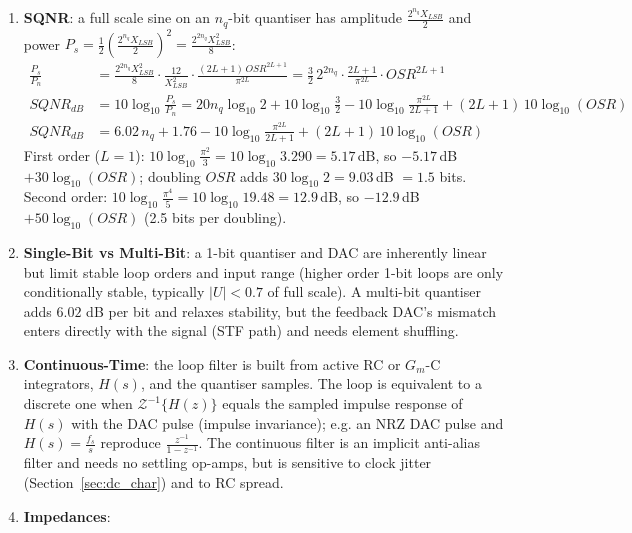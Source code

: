 \begin{enumerate}
\begin{align*}
    \end{align*}
  \item \textbf{SQNR}: a full scale sine on an \(n_q\)-bit quantiser has amplitude
    \(\frac{2^{n_q} X_{LSB}}{2}\) and power \(P_s = \frac{1}{2}\left(\frac{2^{n_q} X_{LSB}}{2}\right)^2 = \frac{2^{2n_q} X_{LSB}^2}{8}\):
    \begin{align*}
      \frac{P_s}{P_n} &= \frac{2^{2n_q} X_{LSB}^2}{8}\cdot\frac{12}{X_{LSB}^2}\cdot\frac{(2L + 1)\, OSR^{2L+1}}{\pi^{2L}} = \frac{3}{2}\, 2^{2n_q}\cdot\frac{2L + 1}{\pi^{2L}}\cdot OSR^{2L+1} \\
      SQNR_{dB} &= 10\log_{10}\frac{P_s}{P_n} = 20 n_q \log_{10} 2 + 10\log_{10}\frac{3}{2} - 10\log_{10}\frac{\pi^{2L}}{2L + 1} + (2L + 1)\, 10\log_{10}(OSR) \\
      SQNR_{dB} &= 6.02\, n_q + 1.76 - 10\log_{10}\frac{\pi^{2L}}{2L + 1} + (2L + 1)\, 10\log_{10}(OSR)
    \end{align*}
    First order (\(L = 1\)): \(10\log_{10}\frac{\pi^2}{3} = 10\log_{10} 3.290 = 5.17\,\)dB, so
    \(-5.17\,\)dB \(+ 30\log_{10}(OSR)\); doubling \(OSR\) adds \(30\log_{10} 2 = 9.03\,\)dB \(= 1.5\)
    bits. Second order: \(10\log_{10}\frac{\pi^4}{5} = 10\log_{10} 19.48 = 12.9\,\)dB, so
    \(-12.9\,\)dB \(+ 50\log_{10}(OSR)\) (2.5 bits per doubling).
  \item \textbf{Single-Bit vs Multi-Bit}: a 1-bit quantiser and DAC are
    inherently linear but limit stable loop orders and input range (higher
    order 1-bit loops are only conditionally stable, typically \(|U| < 0.7\)
    of full scale). A multi-bit quantiser adds \(6.02\) dB per bit and relaxes
    stability, but the feedback DAC's mismatch enters directly with the
    signal (STF path) and needs element shuffling.
  \item \textbf{Continuous-Time}: the loop filter is built from active RC or
    \(G_m\)-C integrators, \(H(s)\), and the quantiser samples. The loop is
    equivalent to a discrete one when \(\mathcal{Z}^{-1}\{H(z)\}\) equals the sampled
    impulse response of \(H(s)\) with the DAC pulse (impulse invariance);
    e.g. an NRZ DAC pulse and \(H(s) = \frac{f_s}{s}\) reproduce
    \(\frac{z^{-1}}{1 - z^{-1}}\). The continuous filter is an implicit
    anti-alias filter and needs no settling op-amps, but is sensitive to
    clock jitter (Section~\ref{sec:dc_char}) and to RC spread.
  \item \textbf{Impedances}:

\end{enumerate}
